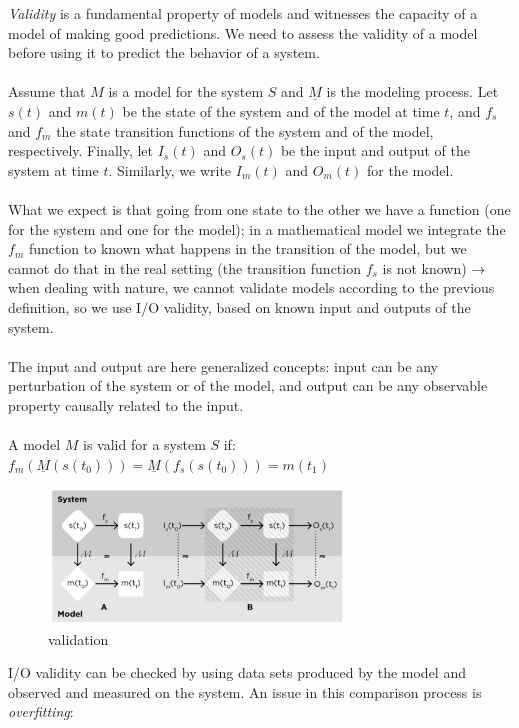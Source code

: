 \emph{Validity} is a fundamental property of models and witnesses the
capacity of a model of making good predictions. We need to assess the validity of a
model before using it to predict the behavior of a system.
\\
\\
\noindent
Assume that $M$ is a model for the system $S$ and $\underline{M}$ is the
modeling process. Let $s(t)$ and $m(t)$ be the state of the system and
of the model at time $t$, and $f_s$ and $f_m$ the state transition
functions of the system and of the model, respectively. Finally, let
$I_s(t)$ and $O_s(t)$ be the input and output of the system at time $t$.
Similarly, we write $I_m(t)$ and $O_m(t)$ for the model.
\\
\\
\noindent
What we expect is that going from one state to the other we have a
function (one for the system and one for the model); in a mathematical
model we integrate the $f_m$ function to known what happens in the
transition of the model, but we cannot do that in the real setting (the
transition function $f_s$ is not known) → when dealing with nature, we
cannot validate models according to the previous definition, so we use
I/O validity, based on known input and outputs of the system.
\\
\\
\noindent
The input and output are here generalized concepts: input can be any
perturbation of the system or of the model, and output can be any
observable property causally related to the input.
\\
\\
\noindent
A model $M$ is valid for a system $S$ if:
$f_m(\underline{M}(s(t_0))) = \underline{M}(f_s(s(t_0))) = m(t_1)$

\begin{figure}
\centering
\includegraphics[width=0.7\textwidth]{validation.png}
\caption{validation}
\end{figure}
\noindent
I/O validity can be checked by using data sets produced by the model and
observed and measured on the system. An issue in this comparison process
is \emph{overfitting}:

